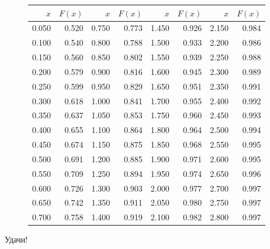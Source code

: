 \documentclass[addpoints]{exam} %
\begin{document}
\begin{figure}[b]
\begin{minipage}[b]{0.35\linewidth}
\begin{tikzpicture}
\end{tikzpicture}
\par\vspace{0pt}
  \end{minipage}%
  \begin{minipage}[b]{0.60\linewidth}
    \centering
\begin{tabular}{rr|rr|rr|rr}
  \hline
$x$ & $F(x)$ & $x$ & $F(x)$ & $x$ & $F(x)$ & $x$ & $F(x)$ \\ 
  \hline
0.050 & 0.520 & 0.750 & 0.773 & 1.450 & 0.926 & 2.150 & 0.984 \\ 
  0.100 & 0.540 & 0.800 & 0.788 & 1.500 & 0.933 & 2.200 & 0.986 \\ 
  0.150 & 0.560 & 0.850 & 0.802 & 1.550 & 0.939 & 2.250 & 0.988 \\ 
  0.200 & 0.579 & 0.900 & 0.816 & 1.600 & 0.945 & 2.300 & 0.989 \\ 
  0.250 & 0.599 & 0.950 & 0.829 & 1.650 & 0.951 & 2.350 & 0.991 \\ 
  0.300 & 0.618 & 1.000 & 0.841 & 1.700 & 0.955 & 2.400 & 0.992 \\ 
  0.350 & 0.637 & 1.050 & 0.853 & 1.750 & 0.960 & 2.450 & 0.993 \\ 
  0.400 & 0.655 & 1.100 & 0.864 & 1.800 & 0.964 & 2.500 & 0.994 \\ 
  0.450 & 0.674 & 1.150 & 0.875 & 1.850 & 0.968 & 2.550 & 0.995 \\ 
  0.500 & 0.691 & 1.200 & 0.885 & 1.900 & 0.971 & 2.600 & 0.995 \\ 
  0.550 & 0.709 & 1.250 & 0.894 & 1.950 & 0.974 & 2.650 & 0.996 \\ 
  0.600 & 0.726 & 1.300 & 0.903 & 2.000 & 0.977 & 2.700 & 0.997 \\ 
  0.650 & 0.742 & 1.350 & 0.911 & 2.050 & 0.980 & 2.750 & 0.997 \\ 
  0.700 & 0.758 & 1.400 & 0.919 & 2.100 & 0.982 & 2.800 & 0.997 \\ 
   \hline
\end{tabular}
\par\vspace{0pt}
\end{minipage}
\label{fig:test}
\end{figure}

\begin{flushright}
Удачи!
\end{flushright}
\end{document}
